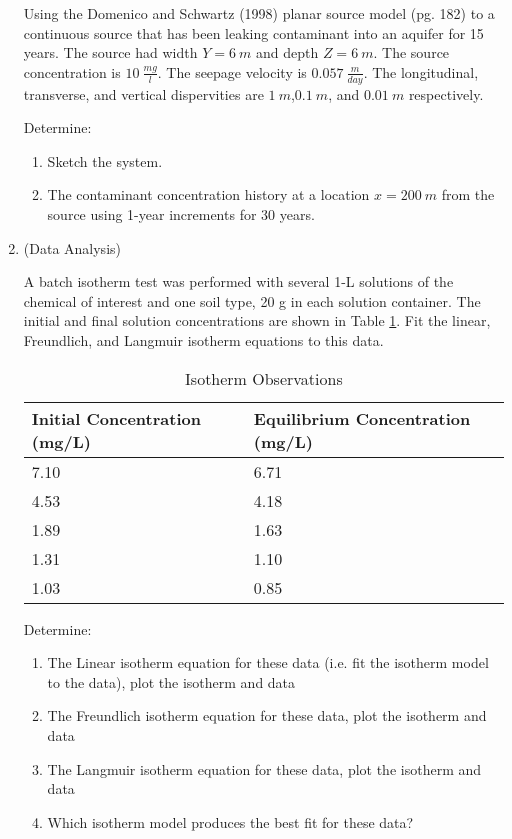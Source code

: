 \documentclass[12pt]{article}
\begin{document}
\begin{enumerate}
Using the Domenico and Schwartz (1998) planar source model (pg. 182) to a continuous source that has been leaking contaminant into an aquifer for 15 years.  The source had width $Y=6~m$ and depth $Z=6~m$. The source concentration is $10~\frac{mg}{l}$. The seepage velocity is $0.057~\frac{m}{day}$. The longitudinal, transverse, and vertical dispervities are $1~m$,$0.1~m$, and $0.01~m$ respectively.

Determine:
\begin{enumerate} %
\item Sketch the system.
\item The contaminant concentration history at a location $x=200~m$ from the source using 1-year increments for 30 years.
\end{enumerate} %


\item (Data Analysis)

A batch isotherm test was performed with several 1-L solutions of the chemical of interest and one soil type, 20 g in each solution container.  The initial and final solution concentrations are shown in Table \ref{tab:Isotherm}.  Fit the linear, Freundlich, and Langmuir isotherm equations to this data.  

\begin{table}[htbp]
\centering
\caption{Isotherm Observations}
\begin{tabular}{p{1.5in}p{1.5in}} %
Initial Concentration (mg/L) & Equilibrium Concentration (mg/L)\\
\hline
\hline
7.10&6.71\\
4.53&4.18\\
1.89&1.63\\
1.31&1.10\\
1.03&0.85\\
\hline
\end{tabular}
\label{tab:Isotherm}
\end{table}

Determine:
\begin{enumerate} %
\item The Linear isotherm equation for these data (i.e. fit the isotherm model to the data), plot the isotherm and data
\item The Freundlich isotherm equation for these data, plot the isotherm and data
\item The Langmuir isotherm equation for these data, plot the isotherm and data
\item Which isotherm model produces the best fit for these data?
\end{enumerate} %


\end{enumerate}
\end{document}
